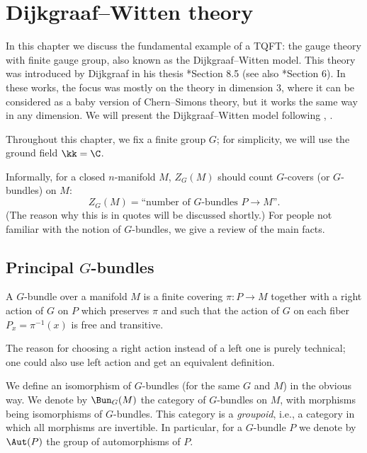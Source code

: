 \chapter{Dijkgraaf--Witten theory}\label{c:DW}
In this chapter we discuss the fundamental example of a TQFT:
the gauge theory with finite gauge group,  also known as the Dijkgraaf--Witten
model. This theory was introduced by Dijkgraaf in his thesis
*{Section 8.5} (see also *{Section 6}). In
these works, the focus was mostly on the theory in dimension 3, where it can be
considered as a baby version of Chern--Simons theory, but it works the same way
in any dimension. We will present the Dijkgraaf--Witten model following
, .

Throughout this chapter, we fix a finite group $G$; for simplicity, we will
use the ground field $\kk=\C$.

Informally, for a closed $n$-manifold $M$, $Z_G(M)$ should count $G$-covers
(or $G$-bundles) on $M$:
\begin{equation}\label{e:dw-informal}
  Z_G(M)=\text{``number of $G$-bundles $P\to M$''}.
\end{equation}
(The reason why this is in quotes will be discussed shortly.) For people
not familiar with the notion of $G$-bundles, we give a review of the main
facts.

\section{Principal $G$-bundles}\label{s:principal-bundles}

\begin{definition}
  A $G$-bundle over a manifold $M$ is a finite covering $\pi\colon P\to M$
  together with a right action of $G$ on $P$ which preserves $\pi$ and
  such that the action of $G$ on each fiber $P_x=\pi^{-1}(x)$ is free and
  transitive.
\end{definition}
The reason for choosing a right action instead of a left one is purely
technical; one could also use left action and get an equivalent definition.

We define an isomorphism of $G$-bundles (for the same $G$ and $M$) in the
obvious way. We denote by $\Bun_G(M)$ the category of $G$-bundles on $M$, with
morphisms being isomorphisms of $G$-bundles. This category is a
\emph{groupoid}, i.e., a category in which all morphisms are
invertible. In particular, for a $G$-bundle $P$ we denote by $\Aut(P)$ the group
of automorphisms of $P$.

